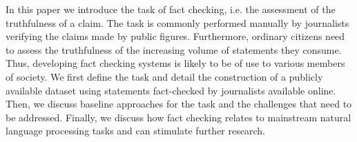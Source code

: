 In this paper we introduce the task of fact checking, i.e. the assessment of the truthfulness of a claim. The task is commonly performed manually by journalists verifying the claims made by public figures. Furthermore, ordinary citizens need to assess the truthfulness of the increasing volume of statements they consume. Thus, developing fact checking systems is likely to be of use to various members of society. We first define the task and detail the construction of a publicly available dataset using statements fact-checked by journalists available online. Then, we discuss baseline approaches for the task and the challenges that need to be addressed. Finally, we discuss how fact checking relates to mainstream natural language processing tasks and can stimulate further research.
